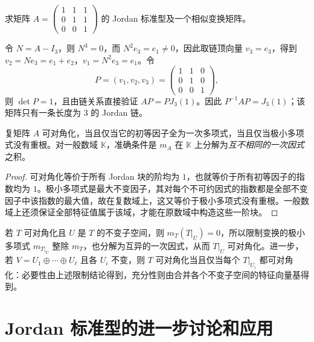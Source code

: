 \begin{example}
\label{ex:xie-jordan-chain-basis}
求矩阵 $A=\begin{pmatrix}1&1&1\\0&1&1\\0&0&1\end{pmatrix}$ 的 Jordan 标准型及一个相似变换矩阵。
\end{example}
\begin{solve}
令 $N=A-I_3$，则 $N^3=0$，而 $N^2e_3=e_1\ne0$，因此取链顶向量 $v_3=e_3$，得到 $v_2=Ne_3=e_1+e_2$，$v_1=N^2e_3=e_1$。令
\[
    P=(v_1,v_2,v_3)=\begin{pmatrix}1&1&0\\0&1&0\\0&0&1\end{pmatrix},
\]
则 $\det P=1$，且由链关系直接验证 $AP=PJ_3(1)$。因此 $P^{-1}AP=J_3(1)$；该矩阵只有一条长度为 $3$ 的 Jordan 链。
\end{solve}

\begin{corollary}
\label{cor:xie-diagonalization-minimal}
复矩阵 $A$ 可对角化，当且仅当它的初等因子全为一次多项式，当且仅当极小多项式没有重根。对一般数域 $\mathbb K$，准确条件是 $m_A$ 在 $\mathbb K$ 上分解为\emph{互不相同的一次因式}之积。
\end{corollary}
\begin{proof}
可对角化等价于所有 Jordan 块的阶均为 $1$，也就等价于所有初等因子的指数均为 $1$。极小多项式是最大不变因子，其对每个不可约因式的指数都是全部不变因子中该指数的最大值，故在复数域上，这又等价于极小多项式没有重根。一般数域上还须保证全部特征值属于该域，才能在原数域中构造这些一阶块。
\end{proof}

若 $T$ 可对角化且 $U$ 是 $T$ 的不变子空间，则 $m_T(T|_U)=0$，所以限制变换的极小多项式 $m_{T|_U}$ 整除 $m_T$，也分解为互异的一次因式，从而 $T|_U$ 可对角化。进一步，若 $V=U_1\oplus\cdots\oplus U_\ell$ 且各 $U_i$ 不变，则 $T$ 可对角化当且仅当每个 $T|_{U_i}$ 都可对角化：必要性由上述限制结论得到，充分性则由合并各个不变子空间的特征向量基得到。

\section{Jordan 标准型的进一步讨论和应用}
\label{sec:xie-jordan-applications}

